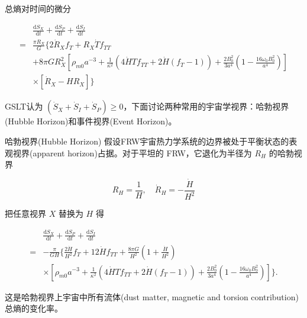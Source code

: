 \documentclass[9pt, dvipsnames]{beamer} %
\begin{document}
\begin{frame}
    总熵对时间的微分

    $$
    \begin{aligned}
        &\frac{\mathrm{d}S_X }{\mathrm{d}t } + \frac{\mathrm{d}S_P }{\mathrm{d}t } + \frac{\mathrm{d}S_I }{\mathrm{d}t } \\
        =&\frac{\pi R_X }{G } \bigg\{2\dot{R}_X f_T + R_X\dot{T}f_{TT} \\
        &+ 8\pi G R_X^2 \left[\rho_{m0}a^{-3} + \frac{1 }{\kappa^2 } \left(4\dot{H} T f_{TT} + 2\dot{H}\left(f_T-1 \right) \right) + \frac{2B_0^2 }{3a^4 } \left(1-\frac{16\omega_0 B_0^2 }{a^4 }  \right) \right] \\
        &\times \left[\dot{R}_X - H R_X \right] \bigg\}
    \end{aligned}
    $$

    GSLT认为 $(\dot{S}_X+\dot{S}_I+\dot{S}_P)\geqslant 0$，下面讨论两种常用的宇宙学视界：哈勃视界(Hubble Horizon)和事件视界(Event Horizon)。

\end{frame}

\begin{frame}{哈勃视界(Hubble Horizon)}
    假设FRW宇宙热力学系统的边界被处于平衡状态的表观视界(apparent horizon)占据。对于平坦的 FRW，它退化为半径为 $R_H$ 的哈勃视界

    $$
    R_H = \frac{1 }{H } ,\quad
    \dot{R}_H = -\frac{\dot{H} }{H^2 }
    $$

    把任意视界 $X$ 替换为 $H$ 得

    $$
    \begin{aligned}
        &\frac{\mathrm{d}S_X }{\mathrm{d}t } + \frac{\mathrm{d}S_P }{\mathrm{d}t } + \frac{\mathrm{d}S_I }{\mathrm{d}t } \\
        =&-\frac{\pi }{G H} \bigg\{\frac{2\dot{H} }{H^2 } f_T + 12\dot{H}f_{TT} +\frac{8\pi G }{H^2 }\left(1+\frac{\dot{H} }{H^2 }  \right) \\
        &\times \left[\rho_{m0}a^{-3} + \frac{1 }{\kappa^2 } \left(4\dot{H}T f_{TT} + 2\dot{H}\left(f_T-1 \right) \right) + \frac{2 B_0^2 }{3a^4 } \left(1-\frac{16\omega_0 B_0^2 }{a^4 }  \right) \right] \bigg\}.
        \end{aligned}
    $$

    这是哈勃视界上宇宙中所有流体(dust matter, magnetic and torsion contribution)总熵的变化率。
    
\end{frame}
\end{document}

